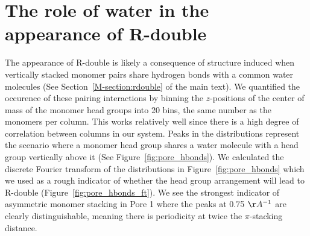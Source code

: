 \documentclass{article}
\begin{document}
  \section{The role of water in the appearance of R-double}\label{section:rdouble}
  
  The appearance of R-double is likely a consequence of structure induced when
  vertically stacked monomer pairs share hydrogen bonds with a common water molecules (See
  Section~\ref{M-section:rdouble} of the main text). We quantified the occurence of
  these pairing interactions by binning the $z$-positions of the center of mass of 
  the monomer head groups into 20 bins, the same number as the monomers per column. 
  This works relatively well since there is a high degree of correlation between
  columns in our system. Peaks in the distributions represent the scenario where a monomer head group
  shares a water molecule with a head group vertically above it (See Figure~\ref{fig:pore_hbonds}).
  We calculated the discrete Fourier transform of the distributions in Figure~\ref{fig:pore_hbonds}
  which we used as a rough indicator of whether the head group arrangement will lead to R-double
  (Figure~\ref{fig:pore_hbonds_ft}). We see the strongest indicator of asymmetric monomer
  stacking in Pore 1 where the peaks at 0.75 $\AA^{-1}$ are clearly distinguishable, meaning
  there is periodicity at twice the $\pi$-stacking distance.
  
\end{document}
